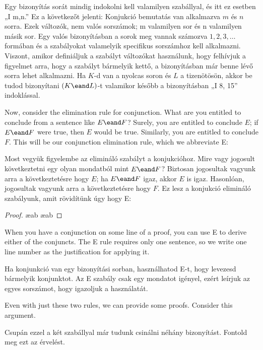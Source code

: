Egy bizonyítás sorát mindig indokolni kell valamilyen szabállyal, és itt ez esetben „{\eand}I m,n.”
Ez a következőt jelenti: Konjukció bemutatás van alkalmazva $m$ és $n$ sorra. Ezek változók, nem valós sorszámok; m valamilyen sor és n valamilyen másik sor. Egy valós bizonyításban a sorok meg vannak számozva $1, 2, 3, \ldots$ formában és a szabályokat valamelyik specifikus sorszámhoz kell alkalmazni. Viszont, amikor definiáljuk a szabályt változókat használunk, hogy felhívjuk a figyelmet arra, hogy a szabályt bármelyik kettő, a bizonyításban már benne lévő sorra lehet alkalmazni. Ha $K$-d van a nyolcas soron és $L$ a tizenötösön, akkor be tudod bizonyítani $(K\eand L)$-t valamikor később a bizonyításban „{\eand}I 8, 15” indoklással.

Now, consider the elimination rule for conjunction. What are you entitled to conclude from a sentence like $E \eand F$? Surely, you are entitled to conclude $E$; if $E \eand F$ were true, then $E$ would be true. Similarly, you are entitled to conclude $F$. This will be our conjunction elimination rule, which we abbreviate {\eand}E:

Most vegyük figyelembe az elimináló szabályt a konjukcióhoz. Mire vagy jogosult következtetni egy olyan mondatból mint $E \eand F$?  Biztosan jogosultak vagyunk arra a következtetésre hogy $E$; ha $E \eand F$ igaz, akkor $E$ is igaz. Hasonlóan, jogosultak vagyunk arra a következtetésre hogy $F$. Ez lesz a konjukció elimináló szabályunk, amit rövidítünk úgy hogy {\eand}E:

\begin{proof}
	 \ae{ab}
	 \ae{ab}
\end{proof}



When you have a conjunction on some line of a proof, you can use {\eand}E to derive either of the conjuncts. The {\eand}E rule requires only one sentence, so we write one line number as the justification for applying it.

Ha konjunkció van egy bizonyítási sorban, használhatod {\eand}E-t, hogy levezesd bármelyik konjunktot. Az {\eand}E szabály csak egy mondatot igényel, ezért leírjuk az egyes sorszámot, hogy igazoljuk a használatát.

Even with just these two rules, we can provide some proofs. Consider this argument.

Csupán ezzel a két szabállyal már tudunk csinálni néhány bizonyítást.
Fontold meg ezt az érvelést.

